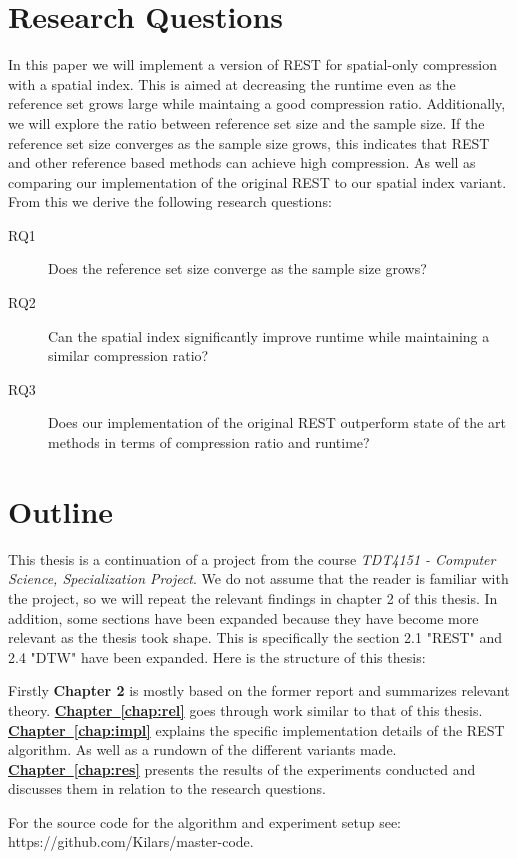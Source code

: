 \section{Research Questions}
In this paper we will implement a version of REST for spatial-only compression with a spatial index. This is aimed at decreasing the runtime even as the reference set grows large while maintaing a good compression ratio. Additionally, we will explore the ratio between reference set size and the sample size. If the reference set size converges as the sample size grows, this indicates that REST and other reference based methods can achieve high compression. As well as comparing our implementation of the original REST to our spatial index variant. From this we derive the following research questions:

\begin{description}
    \item[RQ1] Does the reference set size converge as the sample size grows?
    \item[RQ2] Can the spatial index significantly improve runtime while maintaining a similar compression ratio?
    \item[RQ3] Does our implementation of the original REST outperform state of the art methods in terms of compression ratio and runtime?
\end{description}

\section{Outline}
This thesis is a continuation of a project from the course \textit{TDT4151 - Computer Science, Specialization Project}. We do not assume that the reader is familiar with the project, so we will repeat the relevant findings in chapter 2 of this thesis. In addition, some sections have been expanded because they have become more relevant as the thesis took shape. This is specifically the section 2.1 "REST" and 2.4 "DTW" have been expanded. Here is the structure of this thesis:

Firstly \textbf{Chapter 2} is mostly based on the former report and summarizes relevant theory.
\newline
\textbf{\hyperref[chap:impl]{Chapter~\ref*{chap:rel}}} goes through work similar to that of this thesis.
\newline
\textbf{\hyperref[chap:impl]{Chapter~\ref*{chap:impl}}} explains the specific implementation details of the REST algorithm. As well as a rundown of the different variants made.
\newline
\textbf{\hyperref[chap:impl]{Chapter~\ref*{chap:res}}} presents the results of the experiments conducted and discusses them in relation to the research questions.

For the source code for the algorithm and experiment setup see: https://github.com/Kilars/master-code.

